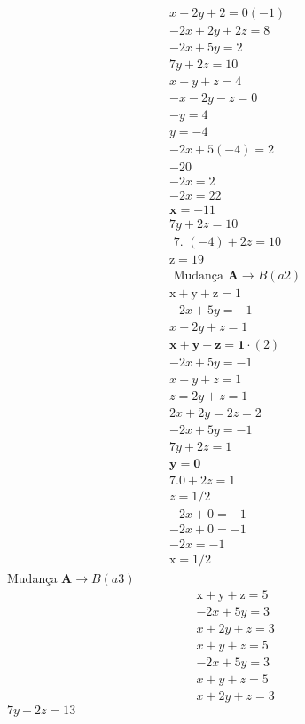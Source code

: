 \documentclass[10pt]{article}
\begin{document}
$$
\begin{aligned}
& x+2 y+2=0(-1) \\
& -2 x+2 y+2 z=8 \\
& -2 x+5 y=2 \\
& 7 y+2 z=10 \\
& x+y+z=4 \\
& -x-2 y-z=0 \\
& -y=4 \\
& y=-4 \\
& -2 x+5(-4)=2 \\
& -20 \\
& -2 x=2 \\
& -2 x=22 \\
& \mathbf{x}=-11 \\
& 7 y+2 z=10 \\
& \text { 7. }(-4)+2 z=10 \\
& \mathrm{z}=19 \\
& \text { Mudança } \mathbf{A} \rightarrow B(a 2) \\
& \mathrm{x}+\mathrm{y}+\mathrm{z}=1 \\
& -2 x+5 y=-1 \\
& x+2 y+z=1 \\
& \mathbf{x}+\mathbf{y}+\mathbf{z}=\mathbf{1} \cdot(2) \\
& -2 x+5 y=-1 \\
& x+y+z=1 \\
& z=2 y+z=1 \\
& 2 x+2 y=2 z=2 \\
& -2 x+5 y=-1 \\
& 7 y+2 z=1 \\
& \mathbf{y}=\mathbf{0} \\
& 7.0+2 z=1 \\
& z=1 / 2 \\
& -2 x+0=-1 \\
& -2 x+0=-1 \\
& -2 x=-1 \\
& \mathrm{x}=1 / 2
\end{aligned}
$$
Mudança $\mathbf{A} \rightarrow B(a 3)$
$$
\begin{aligned}
& \mathrm{x}+\mathrm{y}+\mathrm{z}=5 \\
& -2 x+5 y=3 \\
& x+2 y+z=3 \\
& x+y+z=5 \\
& -2 x+5 y=3 \\
& x+y+z=5 \\
& x+2 y+z=3 
\end{aligned}
$$
$7 y+2 z=13$
\end{document}

